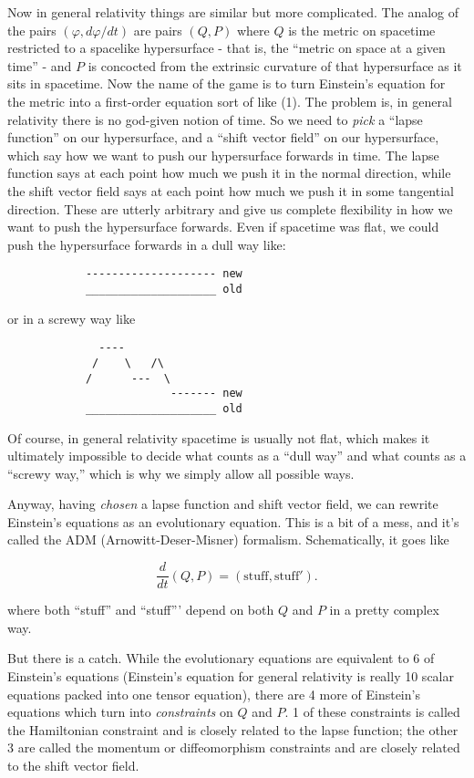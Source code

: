 \documentclass{article}
\begin{document}
Now in general relativity things are similar but more complicated. The
analog of the pairs \((\varphi, d\varphi/dt)\) are pairs \((Q,P)\) where
\(Q\) is the metric on spacetime restricted to a spacelike hypersurface
- that is, the ``metric on space at a given time'' - and \(P\) is
concocted from the extrinsic curvature of that hypersurface as it sits
in spacetime. Now the name of the game is to turn Einstein's equation
for the metric into a first-order equation sort of like (1). The problem
is, in general relativity there is no god-given notion of time. So we
need to \emph{pick} a ``lapse function'' on our hypersurface, and a
``shift vector field'' on our hypersurface, which say how we want to
push our hypersurface forwards in time. The lapse function says at each
point how much we push it in the normal direction, while the shift
vector field says at each point how much we push it in some tangential
direction. These are utterly arbitrary and give us complete flexibility
in how we want to push the hypersurface forwards. Even if spacetime was
flat, we could push the hypersurface forwards in a dull way like:

\begin{verbatim}
            -------------------- new
            ____________________ old
\end{verbatim}

or in a screwy way like

\begin{verbatim}
              ----
             /    \   /\
            /      ---  \
                         ------- new
            ____________________ old
\end{verbatim}

Of course, in general relativity spacetime is usually not flat, which
makes it ultimately impossible to decide what counts as a ``dull way''
and what counts as a ``screwy way,'' which is why we simply allow all
possible ways.

Anyway, having \emph{chosen} a lapse function and shift vector field, we
can rewrite Einstein's equations as an evolutionary equation. This is a
bit of a mess, and it's called the ADM (Arnowitt-Deser-Misner)
formalism. Schematically, it goes like

\[\frac{d}{dt}(Q,P) = (\text{stuff},\text{stuff}').\tag{2}\]

where both ``stuff'' and ``stuff''' depend on both \(Q\) and \(P\) in a
pretty complex way.

But there is a catch. While the evolutionary equations are equivalent to
6 of Einstein's equations (Einstein's equation for general relativity is
really 10 scalar equations packed into one tensor equation), there are 4
more of Einstein's equations which turn into \emph{constraints} on \(Q\)
and \(P\). 1 of these constraints is called the Hamiltonian constraint
and is closely related to the lapse function; the other 3 are called the
momentum or diffeomorphism constraints and are closely related to the
shift vector field.
\end{document}
